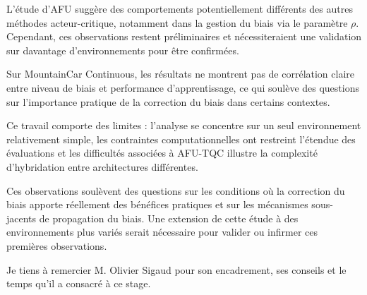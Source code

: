 \documentclass[a4paper, 12pt]{report}
\begin{document}
    L'étude d'AFU suggère des comportements potentiellement différents des
    autres méthodes acteur-critique, notamment dans la gestion du biais via le
    paramètre $\rho$. Cependant, ces observations restent préliminaires et
    nécessiteraient une validation sur davantage d'environnements pour être
    confirmées.

    Sur MountainCar Continuous, les résultats ne montrent pas de corrélation
    claire entre niveau de biais et performance d'apprentissage, ce qui soulève
    des questions sur l'importance pratique de la correction du biais dans
    certains contextes.

    Ce travail comporte des limites : l'analyse se concentre sur un seul
    environnement relativement simple, les contraintes computationnelles ont
    restreint l'étendue des évaluations et les difficultés associées à AFU-TQC
    illustre la complexité d'hybridation entre architectures différentes.

    Ces observations soulèvent des questions sur les conditions où la
    correction du biais apporte réellement des bénéfices pratiques et sur les
    mécanismes sous-jacents de propagation du biais. Une extension de cette
    étude à des environnements plus variés serait nécessaire pour valider ou
    infirmer ces premières observations.

    Je tiens à remercier M. Olivier Sigaud pour son encadrement, ses conseils
    et le temps qu'il a consacré à ce stage.
    
    \printbibliography
\end{document}
